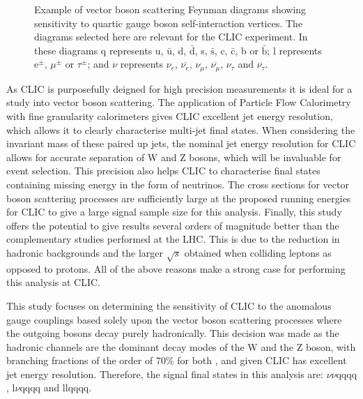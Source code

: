 \begin{figure}[h!]
\caption[Example of vector boson scattering Feynman diagrams showing sensitivity to quartic gauge boson self-interaction vertices.  The diagrams selected here are relevant for the CLIC experiment.  In these diagrams q represents u, $\bar{\text{u}}$, d, $\bar{\text{d}}$, s, $\bar{\text{s}}$, c, $\bar{\text{c}}$, b or $\bar{\text{b}}$;  l represents $\text{e}^{\pm}$, $\mu^{\pm}$ or $\tau^{\pm}$; and $\nu$ represents $\nu_{e}$, $\overline{\nu_{e}}$, $\nu_{\mu}$, $\overline{\nu_{\mu}}$, $\nu_{\tau}$ and $\overline{\nu_{\tau}}$.]{Example of vector boson scattering Feynman diagrams showing sensitivity to quartic gauge boson self-interaction vertices.  The diagrams selected here are relevant for the CLIC experiment.  In these diagrams q represents u, $\bar{\text{u}}$, d, $\bar{\text{d}}$, s, $\bar{\text{s}}$, c, $\bar{\text{c}}$, b or $\bar{\text{b}}$;  l represents $\text{e}^{\pm}$, $\mu^{\pm}$ or $\tau^{\pm}$; and $\nu$ represents $\nu_{e}$, $\overline{\nu_{e}}$, $\nu_{\mu}$, $\overline{\nu_{\mu}}$, $\nu_{\tau}$ and $\overline{\nu_{\tau}}$.}
\label{fig:vectorbosonscatteringclic}
\end{figure}

As CLIC is purposefully deigned for high precision measurements it is ideal for a study into vector boson scattering.  The application of Particle Flow Calorimetry with fine granularity calorimeters gives CLIC excellent jet energy resolution, which allows it to clearly characterise multi-jet final states.  When considering the invariant mass of these paired up jets, the nominal jet energy resolution for CLIC allows for accurate separation of W and Z bosons, which will be invaluable for event selection.  This precision also helps CLIC to characterise final states containing missing energy in the form of neutrinos.  The cross sections for vector boson scattering processes are sufficiently large at the proposed running energies for CLIC to give a large signal sample size for this analysis.  Finally, this study offers the potential to give results several orders of magnitude better than the complementary studies performed at the LHC.  This is due to the reduction in hadronic backgrounds and the larger $\sqrt{s}$ obtained when colliding leptons as opposed to protons.  All of the above reasons make a strong case for performing this analysis at CLIC.  

This study focuses on determining the sensitivity of CLIC to the anomalous gauge couplings based solely upon the vector boson scattering processes where the outgoing bosons decay purely hadronically.  This decision was made as the hadronic channels are the dominant decay modes of the W and the Z boson, with branching fractions of the order of 70\% for both \cite{Beringer:1900zz}, and given CLIC has excellent jet energy resolution.  Therefore, the signal final states in this analysis are: $\nu\nu\text{qqqq}$, $\text{l}\nu\text{qqqq}$ and llqqqq.  

